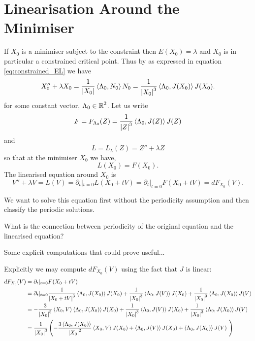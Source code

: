 \documentclass[12pt]{article}
\begin{document}
\section{Linearisation Around the Minimiser}

If \(X_0\) is a minimiser subject to the constraint then \(E(X_0) = \lambda\) and \(X_0\) is in particular a constrained critical point. Thus by  as expressed in equation \eqref{eq:constrained_EL} we have
\[
X_0'' + \lambda X_0 = \frac{1}{\left|{X_0}\right|} \left\langle{\Lambda_0},{N_0}\right\rangle N_0 = \frac{1}{\left|{X_0}\right|^3} \left\langle{\Lambda_0},{J(X_0)}\right\rangle J(X_0).
\]
for some constant vector, \(\Lambda_0 \in \operatorname{\mathbb{R}}^2\). Let us write
\[
F = F_{\Lambda_0} (Z) = \frac{1}{\left|{Z}\right|^3} \left\langle{\Lambda_0},{J(Z)}\right\rangle J(Z)
\]
and
\[
L = L_{\lambda} (Z) = Z'' + \lambda Z
\]
so that at the minimiser \(X_0\) we have,
\[
L(X_0) = F(X_0).
\]
The linearised equation around \(X_0\) is
\begin{equation}
\label{eq:linearised_EL}
V'' + \lambda V = L(V) = \partial_t|_{t=0} L(X_0 + t V) = \partial_t|_{t=0} F(X_0 + t V) = dF_{X_0} (V).
\end{equation}

We want to solve this equation first without the periodicity assumption and then classify the periodic solutions.

{\color{red} What is the connection between periodicity of the original equation and the linearised equation?}

{\color{red} Some explicit computations that could prove useful...}

Explicitly we may compute \(dF_{X_0} (V)\) using the fact that \(J\) is linear:
\[
\begin{split}
dF_{X_0} (V) &= \partial_t|_{t=0} F(X_0 + tV) \\
&= \partial_t|_{t=0} \frac{1}{\left|{X_0 + tV}\right|^3}  \left\langle{\Lambda_0},{J(X_0)}\right\rangle J(X_0) + \frac{1}{\left|{X_0}\right|^3} \left\langle{\Lambda_0},{J(V)}\right\rangle J(X_0) + \frac{1}{\left|{X_0}\right|^3} \left\langle{\Lambda_0},{J(X_0)}\right\rangle J(V) \\
&= -\frac{3}{\left|{X_0}\right|^5} \left\langle{X_0},{V}\right\rangle \left\langle{\Lambda_0},{J(X_0)}\right\rangle J(X_0) + \frac{1}{\left|{X_0}\right|^3} \left\langle{\Lambda_0},{J(V)}\right\rangle J(X_0) + \frac{1}{\left|{X_0}\right|^3} \left\langle{\Lambda_0},{J(X_0)}\right\rangle J(V) \\
&= \frac{1}{\left|{X_0}\right|^3} \left(-\frac{3\left\langle{\Lambda_0},{J(X_0)}\right\rangle}{\left|{X_0}\right|^2} \left\langle{X_0},{V}\right\rangle  J(X_0) + \left\langle{\Lambda_0},{J(V)}\right\rangle J(X_0) + \left\langle{\Lambda_0},{J(X_0)}\right\rangle J(V) \ \right)
\end{split}
\]
\end{document}
